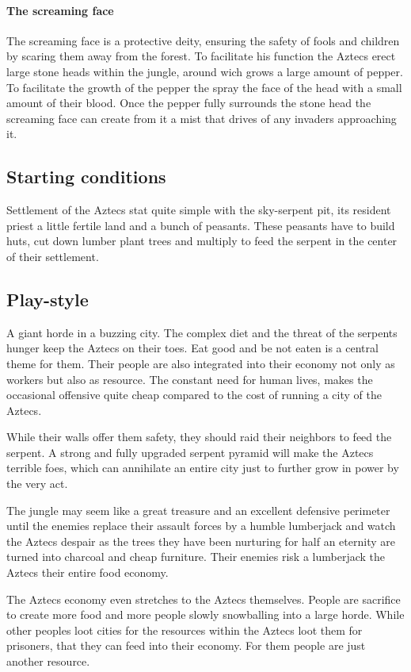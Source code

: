 \paragraph{The screaming face}
The screaming face is a protective deity, ensuring the safety of fools and
children by scaring them away from the forest. To facilitate his function the
\gls{Aztecs} erect large stone heads within the jungle, around wich grows a
large amount of pepper. To facilitate the growth of the pepper the spray the
face of the head with a small amount of their blood. Once the pepper fully
surrounds the stone head the screaming face can create from it a mist that
drives of any invaders approaching it.

\subsection{Starting conditions}
Settlement of the \gls{Aztecs} stat quite simple with the sky-serpent pit, its
resident priest a little fertile land and a bunch of peasants. These peasants
have to build huts, cut down lumber plant trees and multiply to feed the
serpent in the center of their settlement.

\subsection{Play-style}
A giant horde in a buzzing city. The complex diet and the threat of the
serpents hunger keep the \gls{Aztecs} on their toes. Eat good and be not eaten
is a central theme for them. Their people are also integrated into their
economy not only as workers but also as resource. The constant need for human
lives, makes the occasional offensive quite cheap compared to the cost of
running a city of the \gls{Aztecs}.

While their walls offer them safety, they should raid their neighbors to feed
the serpent. A strong and fully upgraded serpent pyramid will make the
\gls{Aztecs} terrible foes, which can annihilate an entire city just to further
grow in power by the very act.

The jungle may seem like a great treasure and an excellent defensive perimeter
until the enemies replace their assault forces by a humble lumberjack and watch
the \gls{Aztecs} despair as the trees they have been nurturing for half an
eternity are turned into charcoal and cheap furniture. Their enemies risk a
lumberjack the \gls{Aztecs} their entire food economy.

The \gls{Aztecs} economy even stretches to the \gls{Aztecs} themselves. People
are sacrifice to create more food and more people slowly snowballing into a
large horde. While other peoples loot cities for the resources within the
\gls{Aztecs} loot them for prisoners, that they can feed into their economy.
For them people are just another resource.
